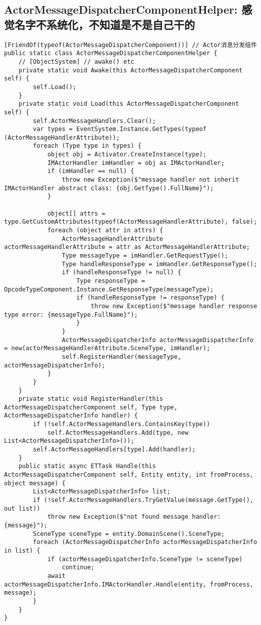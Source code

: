 \documentclass[9pt, b5paper]{article}
\begin{document}
\subsection{ActorMessageDispatcherComponentHelper: 感觉名字不系统化，不知道是不是自己干的}
\label{sec-1-11}
\begin{verbatim}
[FriendOf(typeof(ActorMessageDispatcherComponent))] // Actor消息分发组件
public static class ActorMessageDispatcherComponentHelper {
    // [ObjectSystem] // awake() etc
    private static void Awake(this ActorMessageDispatcherComponent self) {
        self.Load();
    }
    private static void Load(this ActorMessageDispatcherComponent self) {
        self.ActorMessageHandlers.Clear();
        var types = EventSystem.Instance.GetTypes(typeof (ActorMessageHandlerAttribute));
        foreach (Type type in types) {
            object obj = Activator.CreateInstance(type);
            IMActorHandler imHandler = obj as IMActorHandler;
            if (imHandler == null) {
                throw new Exception($"message handler not inherit IMActorHandler abstract class: {obj.GetType().FullName}");
            }

            object[] attrs = type.GetCustomAttributes(typeof(ActorMessageHandlerAttribute), false);
            foreach (object attr in attrs) {
                ActorMessageHandlerAttribute actorMessageHandlerAttribute = attr as ActorMessageHandlerAttribute;
                Type messageType = imHandler.GetRequestType();
                Type handleResponseType = imHandler.GetResponseType();
                if (handleResponseType != null) {
                    Type responseType = OpcodeTypeComponent.Instance.GetResponseType(messageType);
                    if (handleResponseType != responseType) {
                        throw new Exception($"message handler response type error: {messageType.FullName}");
                    }
                }
                ActorMessageDispatcherInfo actorMessageDispatcherInfo = new(actorMessageHandlerAttribute.SceneType, imHandler);
                self.RegisterHandler(messageType, actorMessageDispatcherInfo);
            }
        }
    }
    private static void RegisterHandler(this ActorMessageDispatcherComponent self, Type type, ActorMessageDispatcherInfo handler) {
        if (!self.ActorMessageHandlers.ContainsKey(type)) 
            self.ActorMessageHandlers.Add(type, new List<ActorMessageDispatcherInfo>());
        self.ActorMessageHandlers[type].Add(handler);
    }
    public static async ETTask Handle(this ActorMessageDispatcherComponent self, Entity entity, int fromProcess, object message) {
        List<ActorMessageDispatcherInfo> list;
        if (!self.ActorMessageHandlers.TryGetValue(message.GetType(), out list)) 
            throw new Exception($"not found message handler: {message}");
        SceneType sceneType = entity.DomainScene().SceneType;
        foreach (ActorMessageDispatcherInfo actorMessageDispatcherInfo in list) {
            if (actorMessageDispatcherInfo.SceneType != sceneType) 
                continue;
            await actorMessageDispatcherInfo.IMActorHandler.Handle(entity, fromProcess, message);   
        }
    }
}
\end{verbatim}
\end{document}
